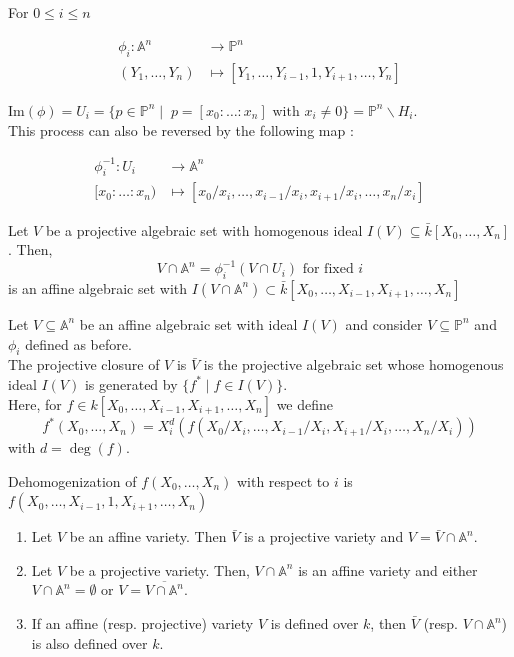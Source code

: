 \documentclass[oneside, 12pt, ]{scrbook}
\theoremstyle{theorem}
\begin{document}
For $ 0 \le i \le n$
\begin{center}
\begin{align*}
\phi_{i}: \mathbb{A}^n &\rightarrow \mathbb{P}^n \\
(Y_{1}, \hdots , Y_{n}) &\mapsto [Y_{1}, \hdots , Y_{i-1}, 1, Y_{i+1} , \hdots , Y_{n}]
\end{align*}
\end{center}
$\mathrm{Im}(\phi) = U_{i} = \{p \in \mathbb{P}^n \mid \; p =[x_{0}: \hdots  : x_{n}] \text{ with } x_{i} \neq 0\} = \mathbb{P}^n \backslash H_{i}$. \\
This process can also be reversed by the following map : 
\begin{center}
\begin{align*}
\phi_{i}^{-1}: U_{i} &\rightarrow \mathbb{A}^n \\
[x_{0}: \hdots : x_{n}) &\mapsto [x_{0}/x_{i}, \hdots , x_{i-1}/x_{i}, x_{i+1}/x_{i} , \hdots , x_{n}/x_{i}]
\end{align*}
\end{center}

Let $V$ be a projective algebraic set with homogenous ideal $I(V) \subseteq \bar{k}[X_{0} ,\hdots , X_{n}]$. Then, $$V \cap \mathbb{A}^n = \phi_{i}^{-1}(V \cap U_{i}) \text{ for fixed } i $$ is an affine algebraic set with $I(V \cap \mathbb{A}^n ) \subset \bar{k}[X_{0} , \hdots , X_{i-1},X_{i+1}, \hdots , X_{n}]$

\begin{definition}
Let $V \subseteq \mathbb{A}^n$ be an affine algebraic set with ideal $I(V)$ and consider $V \subseteq \mathbb{P}^n$ and $\phi_{i}$ defined as before. \\
The projective closure of $V$ is $\bar{V}$ is the projective algebraic set whose homogenous ideal $I(V)$ is generated by $\{f^* \mid f \in I(V)\}$. \\
Here, for $f \in k[X_{0}, \hdots , X_{i-1}, X_{i+1}, \hdots , X_{n}]$ we define $$f^* (X_{0} , \hdots , X_{n}) = X_{i}^d (f(X_{0}/X_{i}, \hdots , X_{i-1}/X_{i}, X_{i+1}/X_{i}, \hdots , X_{n}/X_{i}))$$ with $d = \deg (f)$.
\end{definition}

\begin{definition}
Dehomogenization of $f(X_{0}, \hdots , X_{n})$ with respect to $i$ is $f(X_{0}, \hdots , X_{i-1}, 1 , X_{i+1}, \hdots ,X_{n})$
\end{definition}

\begin{proposition}
\begin{enumerate}
\item Let $V$ be an affine variety. Then $\bar{V}$ is a projective variety and $V = \bar{V} \cap \mathbb{A}^n$. 
\item Let $V$ be a projective variety. Then, $V \cap \mathbb{A}^n$ is an affine variety and either $V \cap \mathbb{A}^n = \emptyset$ or $V = \overline{V \cap \mathbb{A}^n}$. 
\item If an affine (resp. projective) variety $V$ is defined over $k$, then $\bar{V}$ (resp. $V \cap \mathbb{A}^n$) is also defined over $k$.
\end{enumerate}
\end{proposition}
\end{document}

